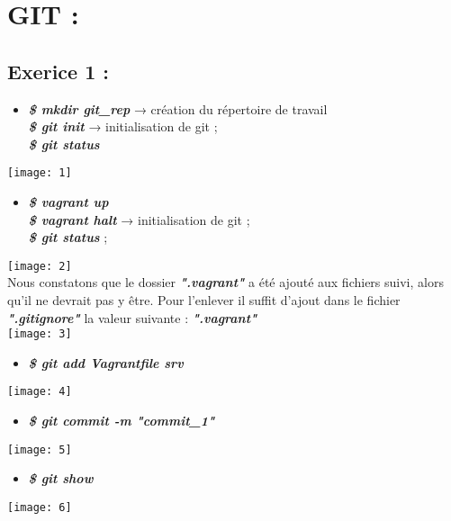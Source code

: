\documentclass[a4paper]{article}
\begin{document}
\newpage
	\section{GIT :}
	\subsection{Exerice 1 :}
	
	\begin{itemize}
		\item \textbf{\textit{\$ mkdir git\_rep}} → création du répertoire de travail \\
			  \textbf{\textit{\$ git init}} → initialisation de git ; \\
			  \textbf{\textit{\$ git status}}  
	\end{itemize}
	\texttt{[image: 1]}
	
	\begin{itemize}
		\item \textbf{\textit{\$ vagrant up}} \\
			  \textbf{\textit{\$ vagrant halt}} → initialisation de git ; \\
			  \textbf{\textit{\$ git status}}  ; \\
	\end{itemize}
	
	\texttt{[image: 2]} \\
	
	Nous constatons que le dossier \textbf{\textit{".vagrant"}} a été ajouté aux fichiers suivi, alors qu’il ne devrait pas y être.
	Pour l’enlever il suffit d’ajout dans le fichier \textbf{\textit{".gitignore"}} la valeur suivante : \textbf{\textit{".vagrant"}} \\
	
	\texttt{[image: 3]}
	
	\begin{itemize}
		\item \textbf{\textit{\$ git add Vagrantfile srv}}
	\end{itemize}
	\texttt{[image: 4]}
	
	\begin{itemize}
		\item \textbf{\textit{\$ git commit -m "commit\_1"}}
	\end{itemize}
	\texttt{[image: 5]}
	
	\begin{itemize}
		\item \textbf{\textit{\$ git show}}
	\end{itemize}
	\texttt{[image: 6]}
	
\end{document}

